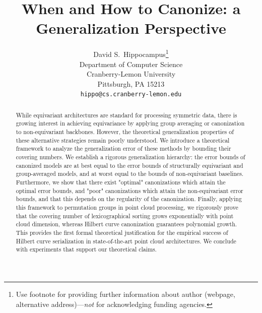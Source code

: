 \documentclass{article}
\title{When and How to Canonize: a Generalization Perspective}
\author{%
  David S.~Hippocampus\thanks{Use footnote for providing further information
    about author (webpage, alternative address)---\emph{not} for acknowledging
    funding agencies.} \\
  Department of Computer Science\\
  Cranberry-Lemon University\\
  Pittsburgh, PA 15213 \\
  \texttt{hippo@cs.cranberry-lemon.edu} \\
}
\theoremstyle{definition}
\theoremstyle{plain}
\begin{document}
\maketitle


\begin{abstract}

While equivariant architectures are standard for processing symmetric data, there is growing interest in achieving equivariance by applying group averaging or canonization to non-equivariant backbones. However, the theoretical generalization properties of these alternative strategies remain poorly understood. We introduce a theoretical framework to analyze the generalization error of these methods by bounding their covering numbers. We establish a rigorous generalization hierarchy: the error bounds of canonized models are at best equal to the error bounds of structurally equivariant and group-averaged models, and at worst equal to the bounds of  non-equivariant baselines. Furthermore, we show that there exist "optimal" canonizations which attain the optimal error bounds, and "poor" canonizations which attain the non-equivariant error bounds, and that this depends on the regularity of the canonization. Finally, applying this framework to permutation groups in point cloud processing, we rigorously prove that the covering number of lexicographical sorting grows exponentially with point cloud dimension, whereas Hilbert curve canonization guarantees polynomial growth. This provides the first formal theoretical justification for the empirical success of Hilbert curve serialization in state-of-the-art point cloud architectures. We conclude with experiments that support our theoretical claims. %


\end{abstract}
\end{document}
